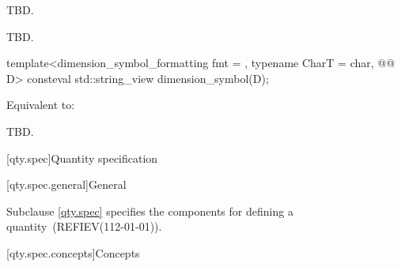 \begin{itemdescr}
\pnum
\effects
TBD.

\pnum
\returns
TBD.
\end{itemdescr}

\begin{itemdecl}
template<dimension_symbol_formatting fmt = {}, typename CharT = char, @@ D>
consteval std::string_view dimension_symbol(D);
\end{itemdecl}

\begin{itemdescr}
\pnum
\effects
Equivalent to:
\begin{codeblock}
TBD.
\end{codeblock}
\end{itemdescr}

[qty.spec]{Quantity specification}

[qty.spec.general]{General}

\pnum
Subclause \ref{qty.spec} specifies the components
for defining a quantity~(REFIEV(112-01-01)).

[qty.spec.concepts]{Concepts}

